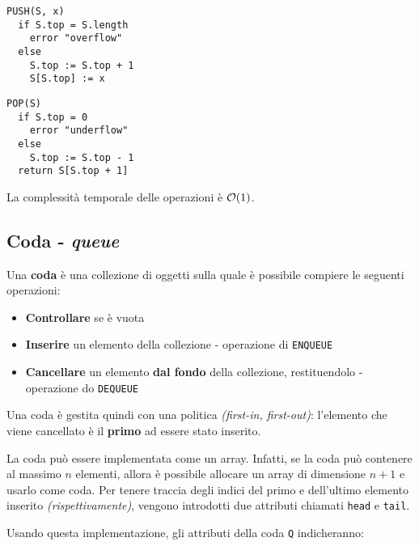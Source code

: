 \documentclass[italian, 10pt]{article}
\begin{document}
\begin{minipage}[t]{0.495\textwidth}
  \begin{lstlisting}[style=pseudocode, caption={\texttt{PUSH} in pila}, label={lst:push-pila}]
PUSH(S, x)
  if S.top = S.length
    error "overflow"
  else
    S.top := S.top + 1
    S[S.top] := x
  \end{lstlisting}
\end{minipage}
\begin{minipage}[t]{0.495\textwidth}
  \begin{lstlisting}[style=pseudocode, caption={\texttt{POP} in pila}, label={lst:pop-pila}]
POP(S)
  if S.top = 0
    error "underflow"
  else
    S.top := S.top - 1
  return S[S.top + 1]
  \end{lstlisting}
\end{minipage}

La complessità temporale delle operazioni è \(\mathcal{O}(1)\).

\subsection{Coda - \textit{queue}}

Una \textbf{coda} è una collezione di oggetti sulla quale è possibile compiere le seguenti operazioni:

\begin{itemize}
  \item \textbf{Controllare} se è vuota
  \item \textbf{Inserire} un elemento della collezione - operazione di \texttt{ENQUEUE}
  \item \textbf{Cancellare} un elemento \textbf{dal fondo} della collezione, restituendolo - operazione do \texttt{DEQUEUE}
\end{itemize}

Una coda è gestita quindi con una politica \FIFO \textit{(first-in, first-out)}: l'elemento che viene cancellato è il \textbf{primo} ad essere stato inserito.

\bigskip
La coda può essere implementata come un array.
Infatti, se la coda può contenere al massimo \(n\) elementi, allora è possibile allocare un array di dimensione \(n+1\) e usarlo come coda.
Per tenere traccia degli indici del primo e dell'ultimo elemento inserito \textit{(rispettivamente)}, vengono introdotti due attributi chiamati \texttt{head} e \texttt{tail}.

Usando questa implementazione, gli attributi della coda \texttt{Q} indicheranno:
\end{document}
